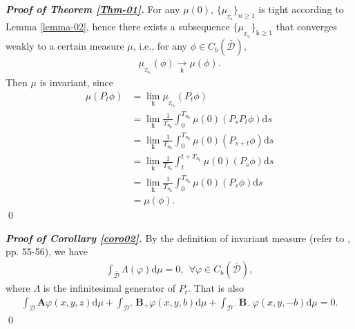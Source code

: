 \documentclass[12pt]{article}
\numberwithin{equation}{section}
\def \AA {\mathbf A}
\def \BB {\mathbf B}
\def\d{\mathrm{d}}
\newcommand{\rk}{\mathrm{k}}
\begin{document}
{\noindent \it \bf Proof of Theorem \ref{Thm-01}.}  
For any $\mu(0)$, $\{\mu_{_{T_{n}}}\}_{n\geq 1}$ is tight according to Lemma \ref{lemma-02}, 
hence there exists a subsequence $\{\mu_{_{T_{n_{\rk}}}}\}_{\rk\geq 1}$ that converges weakly to a certain measure $\mu$, 
i.e., for any $\phi\in C_{b}(\bar{\mathcal{D}})$, 
\begin{align*}
	\mu_{_{T_{n_{\rk}}}}(\phi) \xrightarrow[\rk]{ } \mu (\phi). 
\end{align*}
Then $\mu$ is invariant, since
\begin{align*}
	\mu(P_{t} \phi) & = \lim_{\rk}\mu_{_{T_{n_{\rk}}}}(P_{t}\phi)\\
	& = \lim_{\rk}\frac{1}{T_{n_{\rk}}}\int_{0}^{T_{n_{\rk}}} \mu(0)(P_{s}P_{t}\phi)\d s\\
	& = \lim_{\rk}\frac{1}{T_{n_{\rk}}}\int_{0}^{T_{n_{\rk}}} \mu(0)(P_{s+t}\phi)\d s\\
	& = \lim_{\rk}\frac{1}{T_{n_{\rk}}}\int_{t}^{t+ T_{n_{\rk}}} \mu(0)(P_{s}\phi)\d s\\
	& = \lim_{\rk}\frac{1}{T_{n_{\rk}}}\int_{0}^{T_{n_{\rk}}} \mu(0)(P_{s}\phi)\d s\\
	& = \mu(\phi). 
\end{align*} \qed

{\noindent \it \bf Proof of Corollary \ref{coro02}.}  
By the definition of invariant measure (refer to \cite{BA98}, pp. 55-56),
we have  
\begin{align*}
	\int_{\bar{\mathcal{D}}} \Lambda(\varphi) \d \mu = 0,~~\forall \varphi\in C_{b}(\bar{\mathcal{D}}), 
\end{align*}
where $\Lambda$ is the infinitesimal generator of $P_{t}$. 
That is also
\begin{align*}
	\int_{\mathcal{D}} \AA\varphi(x,y,z) \d \mu 
	+ \int_{\mathcal{D}^+} \BB_{+}\varphi(x,y,b) \d \mu
	+ \int_{\mathcal{D}^-} \BB_{-}\varphi(x,y,- b) \d \mu
	= 0. 
\end{align*}\qed
\end{document}
